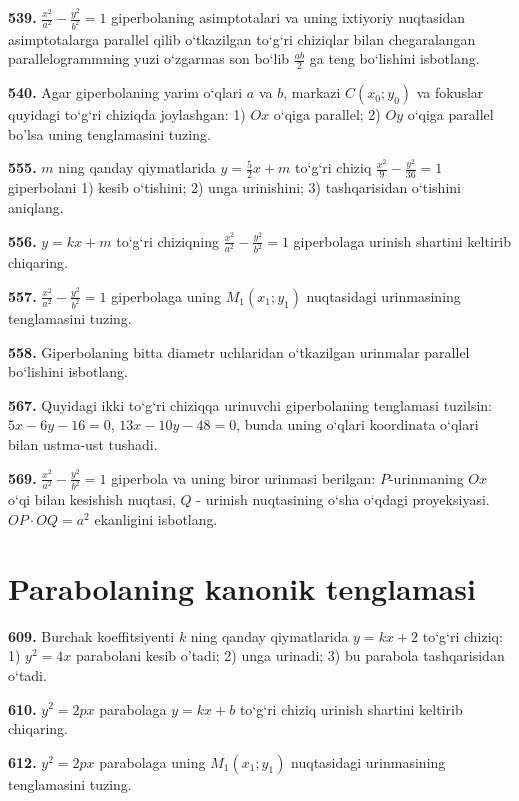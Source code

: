 \textbf{539.} $\frac{x^2}{a^2}-\frac{y^2}{b^2}=1$ giperbolaning asimptotalari va uning ixtiyoriy nuqtasidan asimptotalarga parallel qilib o‘tkazilgan to‘g‘ri chiziqlar bilan chegaralangan parallelogrammning yuzi o‘zgarmas son bo‘lib $\frac{a b}{2}$ ga teng bo‘lishini isbotlang.

\textbf{540.} Agar giperbolaning yarim o‘qlari $a$ va $b$, markazi $C\left(x_0; y_0\right) $ va fokuslar quyidagi to‘g‘ri chiziqda joylashgan: 1) $O x$ o‘qiga parallel; 2) $O y$ o‘qiga parallel bo'lsa uning tenglamasini tuzing.

\textbf{555.} $m$ ning qanday qiymatlarida $y=\frac{5}{2} x+m$ to‘g‘ri chiziq $\frac{x^2}{9}-\frac{y^2}{36}=1$ giperbolani 1) kesib o‘tishini; 2) unga urinishini; 3) tashqarisidan o‘tishini aniqlang.

\textbf{556.} $y=k x+m$ to‘g‘ri chiziqning $\frac{x^2}{a^2}-\frac{y^2}{b^2}=1$ giperbolaga urinish shartini keltirib chiqaring.

\textbf{557.} $\frac{x^2}{a^2}-\frac{y^2}{b^2}=1$ giperbolaga uning $M_1\left(x_1; y_1\right) $ nuqtasidagi urinmasining tenglamasini tuzing.

\textbf{558.} Giperbolaning bitta diametr uchlaridan o‘tkazilgan urinmalar parallel bo‘lishini isbotlang.

\textbf{567.} Quyidagi ikki to‘g‘ri chiziqqa urinuvchi giperbolaning tenglamasi tuzilsin: $5x-6y-16=0$, $13x-10y-48=0$, bunda uning o‘qlari koordinata o‘qlari bilan ustma-ust tushadi.

\textbf{569.} $\frac{x^2}{a^2}-\frac{y^2}{b^2}=1$ giperbola va uning biror urinmasi berilgan: $P$-urinmaning $O x$ o‘qi bilan kesishish nuqtasi, $Q$ - urinish nuqtasining o‘sha o‘qdagi proyeksiyasi. $O P \cdot O Q=a^2$ ekanligini isbotlang.



\section{Parabolaning kanonik tenglamasi}



\textbf{609.} Burchak koeffitsiyenti $k$ ning qanday qiymatlarida $y=kx+2$ to‘g‘ri chiziq: 1) $y^2=4x$ parabolani kesib o'tadi; 2) unga urinadi; 3) bu parabola tashqarisidan o‘tadi.

\textbf{610.} $y^2=2 p x$ parabolaga $y=k x+b$ to‘g‘ri chiziq urinish shartini keltirib chiqaring.

\textbf{612.} $y^2=2 p x$ parabolaga uning $M_1\left(x_1; y_1\right) $ nuqtasidagi urinmasining tenglamasini tuzing.

